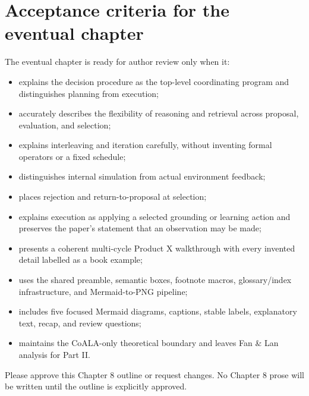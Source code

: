 \section*{Acceptance criteria for the eventual chapter}
The eventual chapter is ready for author review only when it:
\begin{itemize}
  \item explains the decision procedure as the top-level coordinating program and distinguishes planning from execution;
  \item accurately describes the flexibility of reasoning and retrieval across proposal, evaluation, and selection;
  \item explains interleaving and iteration carefully, without inventing formal operators or a fixed schedule;
  \item distinguishes internal simulation from actual environment feedback;
  \item places rejection and return-to-proposal at selection;
  \item explains execution as applying a selected grounding or learning action and preserves the paper's statement that an observation may be made;
  \item presents a coherent multi-cycle Product X walkthrough with every invented detail labelled as a book example;
  \item uses the shared preamble, semantic boxes, footnote macros, glossary/index infrastructure, and Mermaid-to-PNG pipeline;
  \item includes five focused Mermaid diagrams, captions, stable labels, explanatory text, recap, and review questions;
  \item maintains the CoALA-only theoretical boundary and leaves Fan \& Lan analysis for Part II.
\end{itemize}
\begin{takeawaybox}
Please approve this Chapter 8 outline or request changes. No Chapter 8 prose will be written until the outline is explicitly approved.
\end{takeawaybox}

